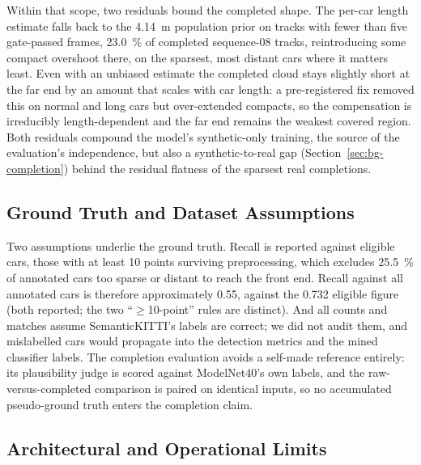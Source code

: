 Within that scope, two residuals bound the completed shape. The per-car length estimate falls
back to the \SI{4.14}{\metre} population prior on tracks with fewer than five gate-passed
frames, \SI{23.0}{\percent} of completed sequence-08 tracks, reintroducing some compact
overshoot there, on the sparsest, most distant cars where it matters least. Even with an
unbiased estimate the completed cloud stays slightly short at the far end by an amount that
scales with car length: a pre-registered fix removed this on normal and long cars but
over-extended compacts, so the compensation is irreducibly length-dependent and the far end
remains the weakest covered region. Both residuals compound the model's synthetic-only
training, the source of the evaluation's independence, but also a synthetic-to-real gap
(Section~\ref{sec:bg-completion}) behind the residual flatness of the sparsest real
completions.

\subsection{Ground Truth and Dataset Assumptions}
\label{sec:disc-gt}

Two assumptions underlie the ground truth. Recall is reported against eligible cars, those
with at least \num{10} points surviving preprocessing, which excludes \SI{25.5}{\percent}
of annotated cars too sparse or distant to reach the front end. Recall against all
annotated cars is therefore approximately \num{0.55}, against the \num{0.732} eligible figure (both
reported; the two ``$\geq$10-point'' rules are distinct). And all counts and matches assume
SemanticKITTI's labels are correct; we did not audit them, and mislabelled cars would
propagate into the detection metrics and the mined classifier labels. The completion
evaluation avoids a self-made reference entirely: its plausibility judge is scored against
ModelNet40's own labels, and the raw-versus-completed comparison is paired on identical
inputs, so no accumulated pseudo-ground truth enters the completion claim.

\subsection{Architectural and Operational Limits}
\label{sec:disc-architectural}

